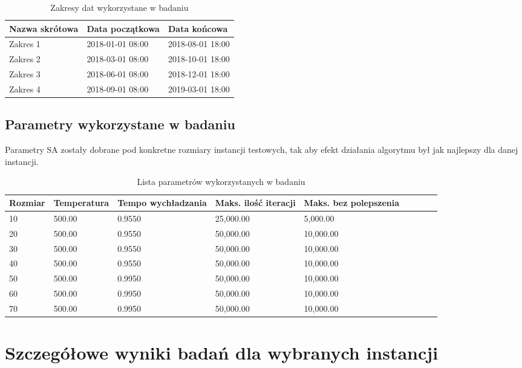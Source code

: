 \begin{table}[H]
    \centering
    \begin{tabular}[width=\textwidth]{ | l | l | l |}
        \hline
        \bfseries Nazwa skrótowa & \bfseries Data początkowa & \bfseries Data końcowa \\
        \hline
        Zakres 1 & 2018-01-01 08:00 & 2018-08-01 18:00 \\
        \hline
        Zakres 2 & 2018-03-01 08:00 & 2018-10-01 18:00 \\
        \hline
        Zakres 3 & 2018-06-01 08:00 & 2018-12-01 18:00 \\
        \hline
        Zakres 4 & 2018-09-01 08:00 & 2019-03-01 18:00 \\
        \hline
    \end{tabular}
    \caption{Zakresy dat wykorzystane w badaniu}
\end{table}

\subsection{Parametry wykorzystane w badaniu}
Parametry SA zostały dobrane pod konkretne rozmiary instancji testowych, tak aby efekt
działania algorytmu był jak najlepszy dla danej instancji.
\begin{table}[H]
\centering
\begin{tabular}[\textwidth]{ | l | l | l | l | l | l | l | l | l | }
\hline
\bfseries Rozmiar & \bfseries Temperatura & \bfseries Tempo wychładzania
	     & \bfseries Maks. ilość iteracji & \bfseries Maks. bez polepszenia\\
\hline
10 & 500.00 & 0.9550 & 25,000.00 & 5,000.00 \\
\hline
20 & 500.00 & 0.9550 & 50,000.00 & 10,000.00 \\
\hline
30 & 500.00 & 0.9550 & 50,000.00 & 10,000.00 \\
\hline
40 & 500.00 & 0.9550 & 50,000.00 & 10,000.00 \\
\hline
50 & 500.00 & 0.9950 & 50,000.00 & 10,000.00 \\
\hline
60 & 500.00 & 0.9950 & 50,000.00 & 10,000.00 \\
\hline
70 & 500.00 & 0.9950 & 50,000.00 & 10,000.00 \\
\hline
\end{tabular}
\caption{Lista parametrów wykorzystanych w badaniu}
\end{table}

\newpage
\section{Szczegółowe wyniki badań dla wybranych instancji}
